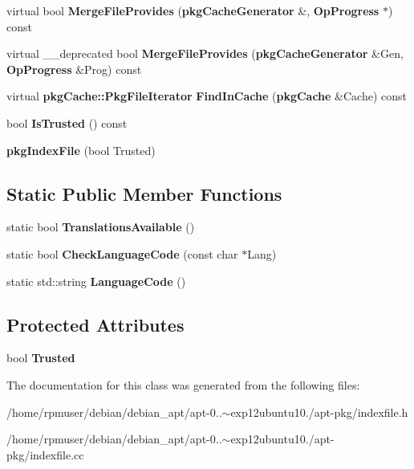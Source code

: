 \begin{DoxyCompactItemize}
\item 
virtual bool {\bfseries \-Merge\-File\-Provides} ({\bf pkg\-Cache\-Generator} \&, {\bf \-Op\-Progress} $\ast$) const \label{classpkgIndexFile_aec43459b9d8e480b4cb3629e807c265f}

\item 
virtual \-\_\-\-\_\-deprecated bool {\bfseries \-Merge\-File\-Provides} ({\bf pkg\-Cache\-Generator} \&\-Gen, {\bf \-Op\-Progress} \&\-Prog) const \label{classpkgIndexFile_a081a7bb202d88763196f3b7757bdf322}

\item 
virtual {\bf pkg\-Cache\-::\-Pkg\-File\-Iterator} {\bfseries \-Find\-In\-Cache} ({\bf pkg\-Cache} \&\-Cache) const \label{classpkgIndexFile_afa0e20f879d9090dac2a7a4830bc7015}

\item 
bool {\bfseries \-Is\-Trusted} () const \label{classpkgIndexFile_aff34485f3c8499f45169fc6ab7e39409}

\item 
{\bfseries pkg\-Index\-File} (bool \-Trusted)\label{classpkgIndexFile_a79738449550662cc0521dc9961a0ae83}

\end{DoxyCompactItemize}
\subsection*{\-Static \-Public \-Member \-Functions}
\begin{DoxyCompactItemize}
\item 
static bool {\bfseries \-Translations\-Available} ()\label{classpkgIndexFile_ac6d61f91a133ebc6ab5a5d6fc56a0629}

\item 
static bool {\bfseries \-Check\-Language\-Code} (const char $\ast$\-Lang)\label{classpkgIndexFile_aeed442847df5cbe81c98e44a57146bfe}

\item 
static std\-::string {\bfseries \-Language\-Code} ()\label{classpkgIndexFile_acfe90c5fa9863991c73bc6a6820cf5de}

\end{DoxyCompactItemize}
\subsection*{\-Protected \-Attributes}
\begin{DoxyCompactItemize}
\item 
bool {\bfseries \-Trusted}\label{classpkgIndexFile_a224b67941df4d54b46be8dd05390428f}

\end{DoxyCompactItemize}


\-The documentation for this class was generated from the following files\-:\begin{DoxyCompactItemize}
\item 
/home/rpmuser/debian/debian\-\_\-apt/apt-\/0..$\sim$exp12ubuntu10./apt-\/pkg/indexfile.\-h\item 
/home/rpmuser/debian/debian\-\_\-apt/apt-\/0..$\sim$exp12ubuntu10./apt-\/pkg/indexfile.\-cc\end{DoxyCompactItemize}

